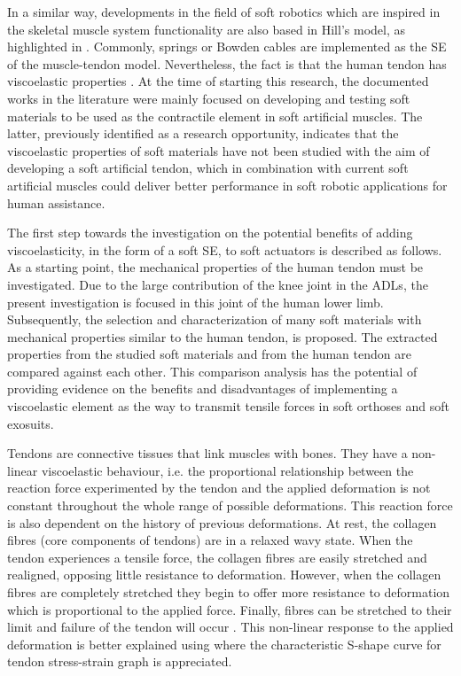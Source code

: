 In a similar way, developments in the field of soft robotics which are inspired in the skeletal muscle system functionality are also based in Hill's model, as highlighted in . Commonly, springs \cite{park2011bio} or Bowden cables \cite{Zhang2013a} are implemented as the SE of the muscle-tendon model. Nevertheless, the fact is that the human tendon has viscoelastic properties \cite{maurel1998biomechanical}. At the time of starting this research, the documented works in the literature were mainly focused on developing and testing soft materials to be used as the contractile element in soft artificial muscles. The latter, previously identified as a research opportunity, indicates that the viscoelastic properties of soft materials have not been studied with the aim of developing a soft artificial tendon, which in combination with current soft artificial muscles could deliver better performance in soft robotic applications for human assistance.

The first step towards the investigation on the potential benefits of adding viscoelasticity, in the form of a soft SE, to soft actuators is described as follows. As a starting point, the mechanical properties of the human tendon must be investigated. Due to the large contribution of the knee joint in the ADLs, the present investigation is focused in this joint of the human lower limb. Subsequently, the selection and characterization of many soft materials with mechanical properties similar to the human tendon, is proposed. The extracted properties from the studied soft materials and from the human tendon are compared against each other. This comparison analysis has the potential of providing evidence on the benefits and disadvantages of implementing a viscoelastic element as the way to transmit tensile forces in soft orthoses and soft exosuits.

Tendons are connective tissues that link muscles with bones. They have a non-linear viscoelastic behaviour, i.e. the proportional relationship between the reaction force experimented by the tendon and the applied deformation is not constant throughout the whole range of possible deformations. This reaction force is also dependent on the history of previous deformations. At rest, the collagen fibres (core components of tendons) are in a relaxed wavy state. When the tendon experiences a tensile force, the collagen fibres are easily stretched and realigned, opposing little resistance to deformation. However, when the collagen fibres are completely stretched they begin to offer more resistance to deformation which is proportional to the applied force. Finally, fibres can be stretched to their limit and failure of the tendon will occur \cite{nordin2001basic}. This non-linear response to the applied deformation is better explained using  where the characteristic S-shape curve for tendon stress-strain graph is appreciated.

